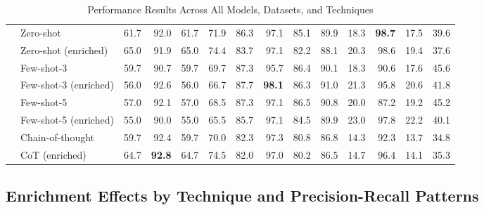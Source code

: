 \documentclass[sigconf,nonacm]{acmart}
\begin{document}
\begin{table}[t]
\begin{adjustbox}{width=\textwidth}
\begin{tabular}{@{}llrrrrrrrrrrrr@{}}
& Zero-shot & 61.7 & 92.0 & 61.7 & 71.9 & 86.3 & 97.1 & 85.1 & 89.9 & 18.3 & \textbf{98.7} & 17.5 & 39.6 \\
& \cellcolor{gray!10}Zero-shot (enriched) & \cellcolor{gray!10}65.0 & \cellcolor{gray!10}91.9 & \cellcolor{gray!10}65.0 & \cellcolor{gray!10}74.4 & \cellcolor{gray!10}83.7 & \cellcolor{gray!10}97.1 & \cellcolor{gray!10}82.2 & \cellcolor{gray!10}88.1 & \cellcolor{gray!10}20.3 & \cellcolor{gray!10}98.6 & \cellcolor{gray!10}19.4 & \cellcolor{gray!10}37.6 \\
& Few-shot-3 & 59.7 & 90.7 & 59.7 & 69.7 & 87.3 & 95.7 & 86.4 & 90.1 & 18.3 & 90.6 & 17.6 & 45.6 \\
& \cellcolor{gray!10}Few-shot-3 (enriched) & \cellcolor{gray!10}56.0 & \cellcolor{gray!10}92.6 & \cellcolor{gray!10}56.0 & \cellcolor{gray!10}66.7 & \cellcolor{gray!10}87.7 & \cellcolor{gray!10}\textbf{98.1} & \cellcolor{gray!10}86.3 & \cellcolor{gray!10}91.0 & \cellcolor{gray!10}21.3 & \cellcolor{gray!10}95.8 & \cellcolor{gray!10}20.6 & \cellcolor{gray!10}41.8 \\
& Few-shot-5 & 57.0 & 92.1 & 57.0 & 68.5 & 87.3 & 97.1 & 86.5 & 90.8 & 20.0 & 87.2 & 19.2 & 45.2 \\
& \cellcolor{gray!10}Few-shot-5 (enriched) & \cellcolor{gray!10}55.0 & \cellcolor{gray!10}90.0 & \cellcolor{gray!10}55.0 & \cellcolor{gray!10}65.5 & \cellcolor{gray!10}85.7 & \cellcolor{gray!10}97.1 & \cellcolor{gray!10}84.5 & \cellcolor{gray!10}89.9 & \cellcolor{gray!10}23.0 & \cellcolor{gray!10}97.8 & \cellcolor{gray!10}22.2 & \cellcolor{gray!10}40.1 \\
& Chain-of-thought & 59.7 & 92.4 & 59.7 & 70.0 & 82.3 & 97.3 & 80.8 & 86.8 & 14.3 & 92.3 & 13.7 & 34.8 \\
& \cellcolor{gray!10}CoT (enriched) & \cellcolor{gray!10}64.7 & \cellcolor{gray!10}\textbf{92.8} & \cellcolor{gray!10}64.7 & \cellcolor{gray!10}74.5 & \cellcolor{gray!10}82.0 & \cellcolor{gray!10}97.0 & \cellcolor{gray!10}80.2 & \cellcolor{gray!10}86.5 & \cellcolor{gray!10}14.7 & \cellcolor{gray!10}96.4 & \cellcolor{gray!10}14.1 & \cellcolor{gray!10}35.3 \\
\bottomrule
\end{tabular}
\end{adjustbox}
\caption{Performance Results Across All Models, Datasets, and Techniques}
\label{tab:results}
\end{table}

\subsection{Enrichment Effects by Technique and Precision-Recall Patterns}
\end{document}
